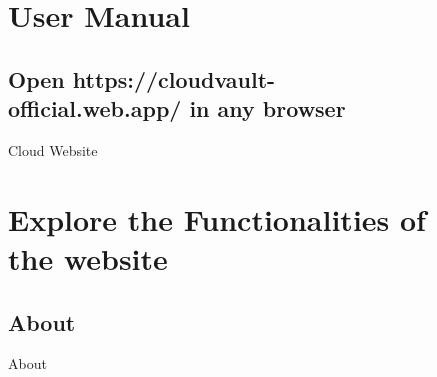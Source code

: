 \begin{figure}[h]
\section{User Manual}
\subsection{ Open https://cloudvault-official.web.app/ in any browser }
  \centering
  \caption{Cloud Website}
\end{figure}

\begin{figure}[h]
\section{Explore the Functionalities of the website}
\subsection{About}
  \centering
   \caption{About}
  
\end{figure}

